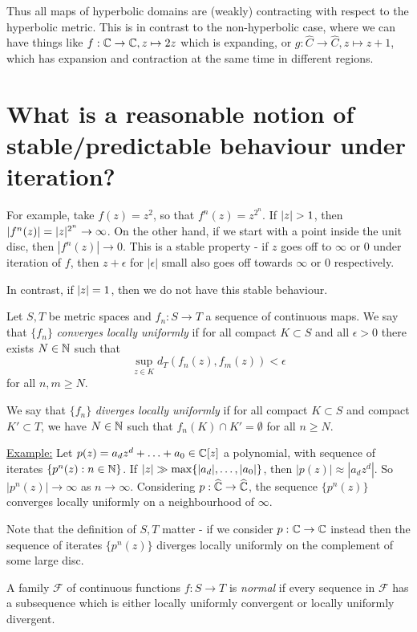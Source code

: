 \documentclass[10pt,a4paper]{article}
\begin{document}
Thus all maps of hyperbolic domains are (weakly) contracting with respect to the hyperbolic metric. This is in contrast to the non-hyperbolic case, where we can have things like $f:\mathbb{C} \to \mathbb{C}, z \mapsto 2z$ which is expanding, or $g:\hat{C} \to \hat{C}, z\mapsto z+1$, which has expansion and contraction at the same time in different regions.

\section{What is a reasonable notion of stable/predictable behaviour under iteration?}

For example, take $f(z) = z^2$, so that $f^n(z) = z^{2^n}$. If $\lvert z\rvert > 1$, then $|f^n(z)| = \lvert z\rvert^{2^n} \to \infty$. On the other hand, if we start with a point inside the unit disc, then $|f^n(z)| \to 0$. This is a stable property - if $z$ goes off to $\infty$ or $0$ under iteration of $f$, then $z+\epsilon$ for $|\epsilon|$ small also goes off towards $\infty$ or 0 respectively.

In contrast, if $\lvert z\rvert=1$, then we do not have this stable behaviour.

\begin{definition}
  Let $S, T$ be metric spaces and $f_n : S \to T$ a sequence of continuous maps. We say that $\{f_n\}$ \emph{converges locally uniformly} if for all compact $K \subset S$ and all $\epsilon >0$ there exists $N \in \mathbb{N}$ such that
  \[
    \sup_{z \in K} d_T(f_n(z), f_m(z)) < \epsilon
  \]
  for all $n, m \geq N$.

  We say that $\{f_n\}$ \emph{diverges locally uniformly} if for all compact $K \subset S$ and compact $K' \subset T$, we have $N \in \mathbb{N}$ such that $f_n(K) \cap K' = \emptyset$ for all $n \geq N$.
\end{definition}

\underline{Example:} Let $p(z) = a_dz^d + \ldots + a_0 \in \mathbb{C}[z]$ a polynomial, with sequence of iterates $\{p^n(z) : n \in \mathbb{N}\}$. If $\lvert z\rvert \gg \max\{|a_d|, \ldots, |a_0|\}$, then $|p(z)| \approx |a_dz^d|$. So $|p^n(z)| \to \infty$ as $n \to \infty$. Considering $p:\widehat{\mathbb{C}} \to \widehat{\mathbb{C}}$, the sequence $\{p^n(z)\}$ converges locally uniformly on a neighbourhood of $\infty$.

Note that the definition of $S, T$ matter - if we consider $p:\mathbb{C} \to \mathbb{C}$ instead then the sequence of iterates $\{p^n(z)\}$ diverges locally uniformly on the complement of some large disc.

\begin{definition}
  A family $\mathcal{F}$ of continuous functions $f: S \to T$ is \emph{normal} if every sequence in $\mathcal{F}$ has a subsequence which is either locally uniformly convergent or locally uniformly divergent.
\end{definition}
\end{document}
